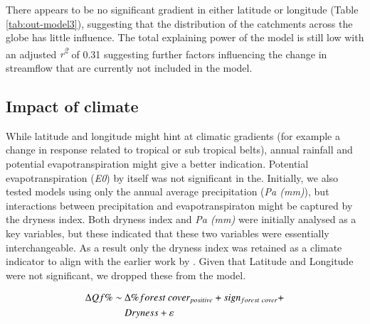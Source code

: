\documentclass[]{elsarticle} %
\begin{document}
There appears to be no significant gradient in either latitude or longitude (Table \ref{tab:out-model3}), suggesting that the distribution of the catchments across the globe has little influence. The total explaining power of the model is still low with an adjusted \emph{r\textsuperscript{2}} of 0.31 suggesting further factors influencing the change in streamflow that are currently not included in the model.

\hypertarget{impact-of-climate}{%
\subsection{Impact of climate}\label{impact-of-climate}}

While latitude and longitude might hint at climatic gradients (for example a change in response related to tropical or sub tropical belts), annual rainfall and potential evapotranspiration might give a better indication.
Potential evapotranspiration (\emph{E0}) by itself was not significant in the. Initially, we also tested models using only the annual average precipitation (\emph{Pa (mm)}), but interactions between precipitation and evapotranspiraton might be captured by the dryness index. Both dryness index and \emph{Pa (mm)} were initially analysed as a key variables, but these indicated that these two variables were essentially interchangeable. As a result only the dryness index was retained as a climate indicator to align with the earlier work by \citet{zhang2017}. Given that Latitude and Longitude were not significant, we dropped these from the model.

\begin{align}
\Delta Qf \% \sim ~ & \Delta \% forest~cover_{positive} + sign_{forest~cover} + \notag \\ & Dryness  + \varepsilon \label{eq:eq5}
\end{align}
\end{document}
